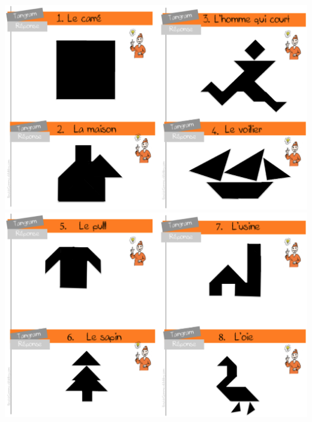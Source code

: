 \begin{exercice*}
\includegraphics[width=16cm]{Geometrie_did/Images/Geo5_activite_rallye1} \\
\includegraphics[width=16cm]{Geometrie_did/Images/Geo5_activite_rallye2}
\end{exercice*}



